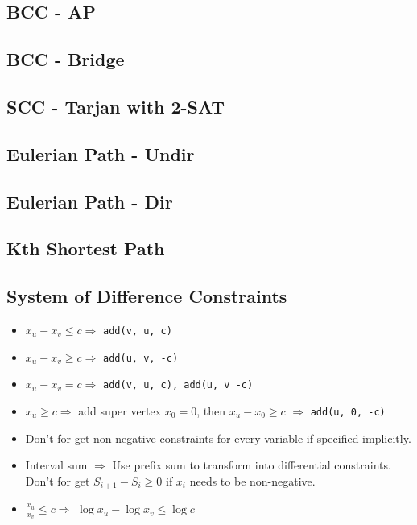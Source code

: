\documentclass[a4paper,10pt,twocolumn,oneside]{article}
\begin{document}
\subsection{BCC - AP}


\subsection{BCC - Bridge}


\subsection{SCC - Tarjan with 2-SAT}


\subsection{Eulerian Path - Undir}


\subsection{Eulerian Path - Dir}


%

\subsection{Kth Shortest Path}


\subsection{System of Difference Constraints}

\begin{itemize}
	\item $x_u - x_v \le c \Rightarrow$ \texttt{add(v, u, c)}
	\item $x_u - x_v \ge c \Rightarrow$ \texttt{add(u, v, -c)}
	\item $x_u - x_v = c \Rightarrow$ \texttt{add(v, u, c), add(u, v -c)}
	\item $x_u \ge c \Rightarrow$ add super vertex $x_0 = 0$, then $x_u - x_0 \ge c$ $\Rightarrow$ \texttt{add(u, 0, -c)}
	\item Don't for get non-negative constraints for every variable if specified implicitly.
	\item Interval sum $\Rightarrow$ Use prefix sum to transform into differential constraints.  Don't for get $S_{i+1} - S_{i} \ge 0$ if $x_i$ needs to be non-negative.
	\item $\frac{x_u}{x_v} \le c \Rightarrow$ $\log{x_u} - \log{x_v} \le \log{c}$
\end{itemize}
\end{document}
